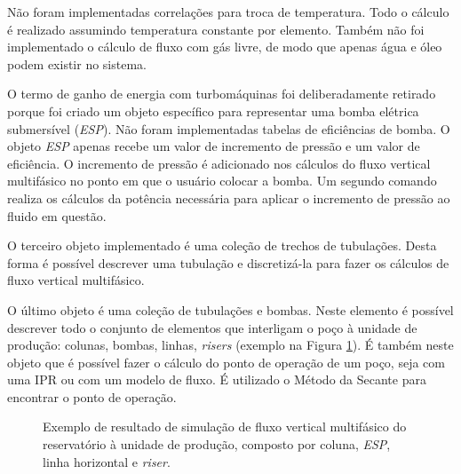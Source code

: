 \documentclass[final,5p]{elsarticle}
\numberwithin{equation}{section}
\begin{document}
        Não foram implementadas correlações para troca de temperatura. Todo o cálculo é realizado assumindo temperatura constante por elemento. Também não foi implementado o cálculo de fluxo com gás livre, de modo que apenas água e óleo podem existir no sistema.

        O termo de ganho de energia com turbomáquinas foi deliberadamente retirado porque foi criado um objeto específico para representar uma bomba elétrica submersível (\emph{ESP}). Não foram implementadas tabelas de eficiências de bomba. O objeto \emph{ESP} apenas recebe um valor de incremento de pressão e um valor de eficiência. O incremento de pressão é adicionado nos cálculos do fluxo vertical multifásico no ponto em que o usuário colocar a bomba. Um segundo comando realiza os cálculos da potência necessária para aplicar o incremento de pressão ao fluido em questão.

        O terceiro objeto implementado é uma coleção de trechos de tubulações. Desta forma é possível descrever uma tubulação e discretizá-la para fazer os cálculos de fluxo vertical multifásico.

        O último objeto é uma coleção de tubulações e bombas. Neste elemento é possível descrever todo o conjunto de elementos que interligam o poço à unidade de produção: colunas, bombas, linhas, \emph{risers} (exemplo na Figura \ref{fig:flow}). É também neste objeto que é possível fazer o cálculo do ponto de operação de um poço, seja com uma IPR ou com um modelo de fluxo. É utilizado o Método da Secante para encontrar o ponto de operação.

        \begin{figure}[hbt!]
            \caption{Exemplo de resultado de simulação de fluxo vertical multifásico do reservatório à unidade de produção, composto por coluna, \emph{ESP}, linha horizontal e \emph{riser}.}
            \label{fig:flow}
        \end{figure}
\end{document}
